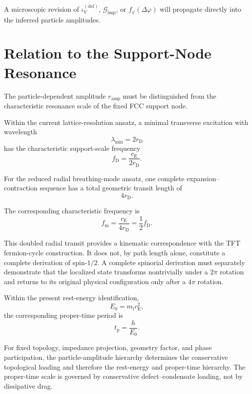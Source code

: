 A microscopic revision of $\iota_V^{(\mathrm{def})}$, $\mathcal{G}_{\mathrm{imp}}$, or $f_{\varphi}(\Delta\varphi)$ will propagate directly into the inferred particle amplitudes.

\section{Relation to the Support-Node Resonance}

The particle-dependent amplitude $r_{\mathrm{amp}}$ must be distinguished from the characteristic resonance scale of the fixed FCC support node.

Within the current lattice-resolution ansatz, a minimal transverse excitation with wavelength
\begin{equation}
    \lambda_{\min} = 2r_{\mathrm{D}}
\end{equation}
has the characteristic support-scale frequency
\begin{equation}
    f_{\mathrm{D}} = \frac{c_{\mathrm{E}}}{2r_{\mathrm{D}}}.
\end{equation}

For the reduced radial breathing-mode ansatz, one complete expansion--contraction sequence has a total geometric transit length of
\begin{equation}
    4r_{\mathrm{D}}.
\end{equation}

The corresponding characteristic frequency is
\begin{equation}
    f_{\mathrm{m}} = \frac{c_{\mathrm{E}}}{4r_{\mathrm{D}}} = \frac{1}{2} f_{\mathrm{D}}.
\end{equation}

This doubled radial transit provides a kinematic correspondence with the TFT fermion-cycle construction. It does not, by path length alone, constitute a complete derivation of spin-$1/2$. A complete spinorial derivation must separately demonstrate that the localized state transforms nontrivially under a $2\pi$ rotation and returns to its original physical configuration only after a $4\pi$ rotation.

Within the present rest-energy identification,
\begin{equation}
    E_0 = m_{\mathrm{i}}c_{\mathrm{E}}^2,
\end{equation}
the corresponding proper-time period is
\begin{equation}
    t_{\mathrm{p}} = \frac{h}{E_0}.
\end{equation}

For fixed topology, impedance projection, geometry factor, and phase participation, the particle-amplitude hierarchy determines the conservative topological loading and therefore the rest-energy and proper-time hierarchy. The proper-time scale is governed by conservative defect--condensate loading, not by dissipative drag.

